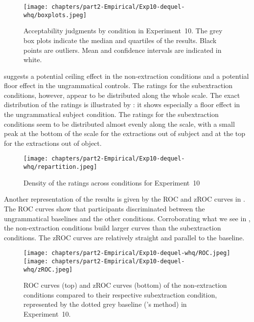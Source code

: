 \begin{figure}
    \centering
    \texttt{[image: chapters/part2-Empirical/Exp10-dequel-whq/boxplots.jpeg]}
    \caption{Acceptability judgments by condition in Experiment~10. The grey box plots indicate the median and quartiles of the results. Black points are outliers. Mean and confidence intervals are indicated in white.}
    \label{fig:exp10-boxplot}
\end{figure}

 suggests a potential ceiling effect in the non-extraction conditions and a potential floor effect in the ungrammatical controls. The ratings for the subextraction conditions, however, appear to be distributed along the whole scale. The exact distribution of the ratings is illustrated by : it shows especially a floor effect in the ungrammatical subject condition. The ratings for the subextraction conditions seem to be distributed almost evenly along the scale, with a small peak at the bottom of the scale for the extractions out of subject and at the top for the extractions out of object. 

\begin{figure}
    \centering
    \texttt{[image: chapters/part2-Empirical/Exp10-dequel-whq/repartition.jpeg]}
    \caption{Density of the ratings across conditions for Experiment~10}
    \label{fig:exp10-repartition}
\end{figure}

Another representation of the results is given by the ROC and zROC curves in . The ROC curves show that participants discriminated between the ungrammatical baselines and the other conditions. Corroborating what we see in , the non-extraction conditions build larger curves than the subextraction conditions. The zROC curves are relatively straight and parallel to the baseline. 

\begin{figure}
    \centering
    \texttt{[image: chapters/part2-Empirical/Exp10-dequel-whq/ROC.jpeg]}
    \texttt{[image: chapters/part2-Empirical/Exp10-dequel-whq/zROC.jpeg]}
    \caption{ROC curves (top) and zROC curves (bottom) of the non-extraction conditions compared to their respective subextraction condition, represented by the dotted grey baseline (\citealt{Dillon.2019}'s method) in Experiment~10.}
    \label{fig:exp10-ROC}
\end{figure}

